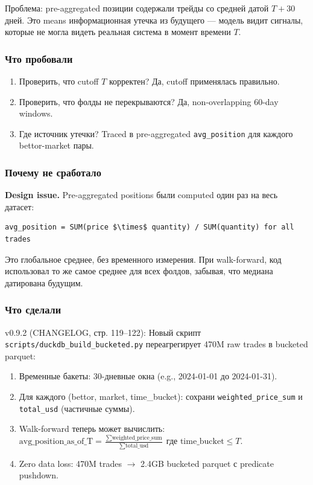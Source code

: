 Проблема: pre-aggregated позиции содержали трейды со средней датой $T + 30$ дней. Это means информационная утечка из будущего --- модель видит сигналы, которые не могла видеть реальная система в момент времени $T$.

\subsubsection*{Что пробовали}
\begin{enumerate}
\item Проверить, что cutoff $T$ корректен? Да, cutoff применялась правильно.
\item Проверить, что фолды не перекрываются? Да, non-overlapping 60-day windows.
\item Где источник утечки? Traced в pre-aggregated \texttt{avg\_position} для каждого bettor-market пары.
\end{enumerate}

\subsubsection*{Почему не сработало}
\textbf{Design issue.} Pre-aggregated positions были computed один раз на весь датасет:
\begin{verbatim}
avg_position = SUM(price $\times$ quantity) / SUM(quantity) for all trades
\end{verbatim}

Это глобальное среднее, без временного измерения. При walk-forward, код использовал то же самое среднее для всех фолдов, забывая, что медиана датирована будущим.

\subsubsection*{Что сделали}
v0.9.2 (CHANGELOG, стр. 119--122): Новый скрипт \texttt{scripts/duckdb\_build\_bucketed.py} переагрегирует 470M raw trades в bucketed parquet:

\begin{enumerate}
\item Временные бакеты: 30-дневные окна (e.g., 2024-01-01 до 2024-01-31).
\item Для каждого (bettor, market, time\_bucket): сохрани \texttt{weighted\_price\_sum} и \texttt{total\_usd} (частичные суммы).
\item Walk-forward теперь может вычислить: $\text{avg\_position\_as\_of\_T} = \frac{\sum \text{weighted\_price\_sum}}{\sum \text{total\_usd}}$ где $\text{time\_bucket} \le T$.
\item Zero data loss: 470M trades $\to$ 2.4GB bucketed parquet с predicate pushdown.
\end{enumerate}

